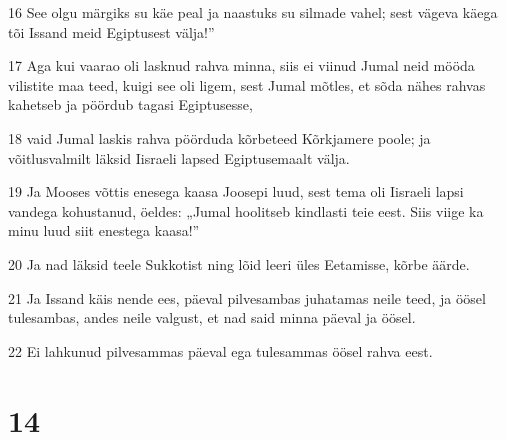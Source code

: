 \par 16 See olgu märgiks su käe peal ja naastuks su silmade vahel; sest vägeva käega tõi Issand meid Egiptusest välja!”
\par 17 Aga kui vaarao oli lasknud rahva minna, siis ei viinud Jumal neid mööda vilistite maa teed, kuigi see oli ligem, sest Jumal mõtles, et sõda nähes rahvas kahetseb ja pöördub tagasi Egiptusesse,
\par 18 vaid Jumal laskis rahva pöörduda kõrbeteed Kõrkjamere poole; ja võitlusvalmilt läksid Iisraeli lapsed Egiptusemaalt välja.
\par 19 Ja Mooses võttis enesega kaasa Joosepi luud, sest tema oli Iisraeli lapsi vandega kohustanud, öeldes: „Jumal hoolitseb kindlasti teie eest. Siis viige ka minu luud siit enestega kaasa!”
\par 20 Ja nad läksid teele Sukkotist ning lõid leeri üles Eetamisse, kõrbe äärde.
\par 21 Ja Issand käis nende ees, päeval pilvesambas juhatamas neile teed, ja öösel tulesambas, andes neile valgust, et nad said minna päeval ja öösel.
\par 22 Ei lahkunud pilvesammas päeval ega tulesammas öösel rahva eest.

\chapter{14}

